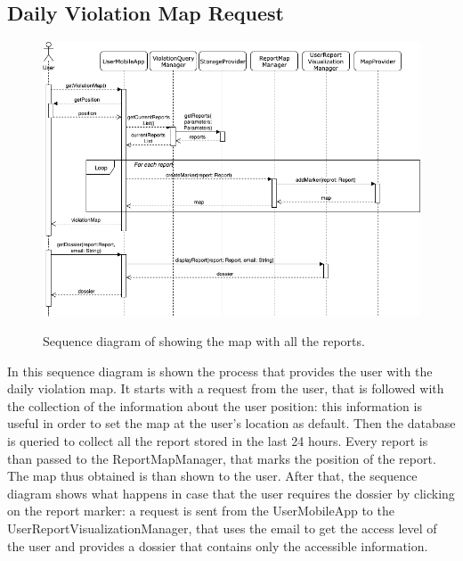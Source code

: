 \documentclass[../RASD.tex]{subfiles}
\begin{document}
    \subsection{Daily Violation Map Request}\label{subsec:daily-violation-map-request}
    \begin{figure}[H]
        \centering
        \includegraphics[scale = 2]{assets/sequence_diagrams/violationMapRequest.png}\\
        \caption[\textit{Sequence} Diagram (\textit{Show reports on map})]{Sequence diagram of showing the map with all the reports.}
    \end{figure}
    In this sequence diagram is shown the process that provides the user with the daily violation map.
    It starts with a request from the user, that is followed with the collection of the information about the user position:
    this information is useful in order to set the map at the user's location as default.
    Then the database is queried to collect all the report stored in the last 24 hours.
    Every report is than passed to the ReportMapManager, that marks the position of the report.
    The map thus obtained is than shown to the user.
    After that, the sequence diagram shows what happens in case that the user requires the dossier by clicking on the report marker:
    a request is sent from the UserMobileApp to the UserReportVisualizationManager, that uses the email to get the access level of the user and provides
    a dossier that contains only the accessible information.
    \newpage
\end{document}
